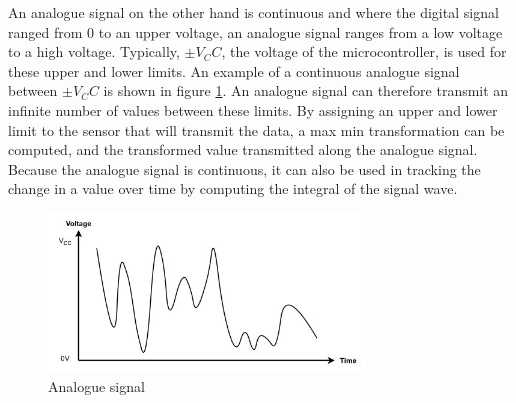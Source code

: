 \vspace{0.6cm}
An analogue signal on the other hand is continuous and where the digital signal ranged from 0 to an upper voltage, an analogue signal ranges from a low voltage to a high voltage. Typically, $±V_CC$, the voltage of the microcontroller, is used for these upper and lower limits. An example of a continuous analogue signal between $±V_CC$ is shown in figure \ref{fig:2:analogue}. An analogue signal can therefore transmit an infinite number of values between these limits. By assigning an upper and lower limit to the sensor that will transmit the data, a max min transformation can be computed, and the transformed value transmitted along the analogue signal. Because the analogue signal is continuous, it can also be used in tracking the change in a value over time by computing the integral of the signal wave.\par
\begin{figure}
	\begin{center}
		\includegraphics[width=0.75\textwidth]{figures/AnalogSignal.jpg}
		\caption{Analogue signal}
		\label{fig:2:analogue}
	\end{center}
\end{figure}


